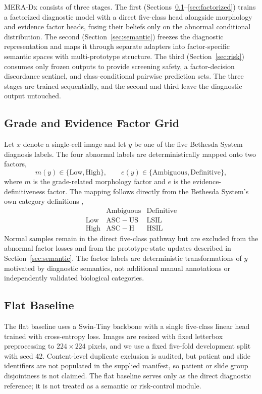 \documentclass[conference]{IEEEtran}
\begin{document}
MERA-Dx consists of three stages. The first (Sections~\ref{sec:task}--\ref{sec:factorized}) trains a factorized diagnostic model with a direct five-class head alongside morphology and evidence factor heads, fusing their beliefs only on the abnormal conditional distribution. The second (Section~\ref{sec:semantic}) freezes the diagnostic representation and maps it through separate adapters into factor-specific semantic spaces with multi-prototype structure. The third (Section~\ref{sec:risk}) consumes only frozen outputs to provide screening safety, a factor-decision discordance sentinel, and class-conditional pairwise prediction sets. The three stages are trained sequentially, and the second and third leave the diagnostic output untouched.

\subsection{Grade and Evidence Factor Grid}
\label{sec:task}
Let $x$ denote a single-cell image and let $y$ be one of the five Bethesda
System diagnosis labels. The four abnormal labels are deterministically
mapped onto two factors,
\begin{equation}
    m(y)\in\{\mathrm{Low},\mathrm{High}\}, \qquad
    e(y)\in\{\mathrm{Ambiguous},\mathrm{Definitive}\},
    \label{eq:factors}
\end{equation}
where $m$ is the grade-related morphology factor and $e$ is the
evidence-definitiveness factor. The mapping follows directly from the
Bethesda System's own category definitions \cite{nayar2015bethesda},
\begin{equation}
\begin{array}{c|cc}
    & \mathrm{Ambiguous} & \mathrm{Definitive}\\ \hline
\mathrm{Low} & \mathrm{ASC\!-\!US} & \mathrm{LSIL}\\
\mathrm{High} & \mathrm{ASC\!-\!H} & \mathrm{HSIL}
\end{array}
\label{eq:grid}
\end{equation}
Normal samples remain in the direct five-class pathway but are excluded
from the abnormal factor losses and from the prototype-state updates
described in Section~\ref{sec:semantic}. The factor labels are
deterministic transformations of $y$ motivated by diagnostic semantics,
not additional manual annotations or independently validated biological
categories.

\subsection{Flat Baseline}
\label{sec:baseline}
The flat baseline uses a Swin-Tiny backbone with a single five-class
linear head trained with cross-entropy loss. Images are resized with
fixed letterbox preprocessing to $224\times224$ pixels, and we use a
fixed five-fold development split with seed 42. Content-level duplicate
exclusion is audited, but patient and slide identifiers are not
populated in the supplied manifest, so patient or slide group
disjointness is not claimed. The flat baseline serves only as the
direct diagnostic reference; it is not treated as a semantic or
risk-control module.
\end{document}
